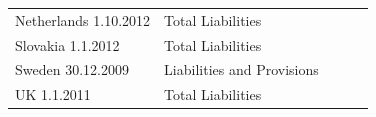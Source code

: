 \documentclass[]{tufte-handout}
\begin{document}
\begin{longtable}[]{@{}lllll@{}}
\begin{minipage}[t]{0.17\columnwidth}
Netherlands 1.10.2012\strut
\end{minipage} & \begin{minipage}[t]{0.17\columnwidth}\raggedright
Total Liabilities\strut
\end{minipage} & \begin{minipage}[t]{0.17\columnwidth}\raggedright
\strut
\end{minipage} & \begin{minipage}[t]{0.17\columnwidth}\raggedright
\strut
\end{minipage} & \begin{minipage}[t]{0.17\columnwidth}\raggedright
\strut
\end{minipage}\tabularnewline
\begin{minipage}[t]{0.17\columnwidth}\raggedright
Slovakia 1.1.2012\strut
\end{minipage} & \begin{minipage}[t]{0.17\columnwidth}\raggedright
Total Liabilities\strut
\end{minipage} & \begin{minipage}[t]{0.17\columnwidth}\raggedright
\strut
\end{minipage} & \begin{minipage}[t]{0.17\columnwidth}\raggedright
\strut
\end{minipage} & \begin{minipage}[t]{0.17\columnwidth}\raggedright
\strut
\end{minipage}\tabularnewline
\begin{minipage}[t]{0.17\columnwidth}\raggedright
Sweden 30.12.2009\strut
\end{minipage} & \begin{minipage}[t]{0.17\columnwidth}\raggedright
Liabilities and Provisions\strut
\end{minipage} & \begin{minipage}[t]{0.17\columnwidth}\raggedright
\strut
\end{minipage} & \begin{minipage}[t]{0.17\columnwidth}\raggedright
\strut
\end{minipage} & \begin{minipage}[t]{0.17\columnwidth}\raggedright
\strut
\end{minipage}\tabularnewline
\begin{minipage}[t]{0.17\columnwidth}\raggedright
UK 1.1.2011\strut
\end{minipage} & \begin{minipage}[t]{0.17\columnwidth}\raggedright
Total Liabilities\strut
\end{minipage} & \begin{minipage}[t]{0.17\columnwidth}\raggedright
\strut
\end{minipage} & \begin{minipage}[t]{0.17\columnwidth}\raggedright
\strut
\end{minipage} & \begin{minipage}[t]{0.17\columnwidth}\raggedright
\strut
\end{minipage}\tabularnewline
\bottomrule
\end{longtable}
\end{document}
